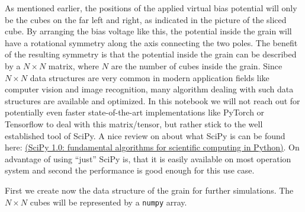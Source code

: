 \documentclass[11pt]{article}
\begin{document}
    As mentioned earlier, the positions of the applied virtual bias
potential will only be the cubes on the far left and right, as indicated
in the picture of the sliced cube. By arranging the bias voltage like
this, the potential inside the grain will have a rotational symmetry
along the axis connecting the two poles. The benefit of the resulting
symmetry is that the potential inside the grain can be described by a
\(N\times N\) matrix, where \(N\) are the number of cubes inside the
grain. Since \(N\times N\) data structures are very common in modern
application fields like computer vision and image recognition, many
algorithm dealing with such data structures are available and optimized.
In this notebook we will not reach out for potentially even faster
state-of-the-art implementations like PyTorch or Tensorflow to deal with
this matrix/tensor, but rather stick to the well established tool of
SciPy. A nice review on about what SciPy is can be found here:
\cite{Virtanen2020}
\href{https://www.nature.com/articles/s41592-019-0686-2.pdf}{(SciPy 1.0:
fundamental algorithms for scientific computing in Python)}. On
advantage of using ``just'' SciPy is, that it is easily available on
most operation system and second the performance is good enough for this
use case.

First we create now the data structure of the grain for further
simulations. The \(N\times N\) cubes will be represented by a
\texttt{numpy} array.
\end{document}
